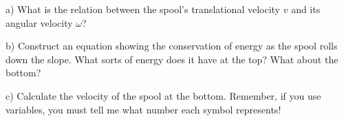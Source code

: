 \documentclass[12pt]{article}
\begin{document}
\begin{enumerate}
	
	a) What is the relation between the spool's translational velocity $v$ and its angular velocity $\omega$? 
	

	b) Construct an equation showing the conservation of energy as the spool rolls down the slope. What sorts of energy does it have at the top? What about the bottom?
	
	c) Calculate the velocity of the spool at the bottom. Remember, if you use variables, you must tell me what number each symbol represents!
	
	
	
\end{enumerate}
\end{document}
